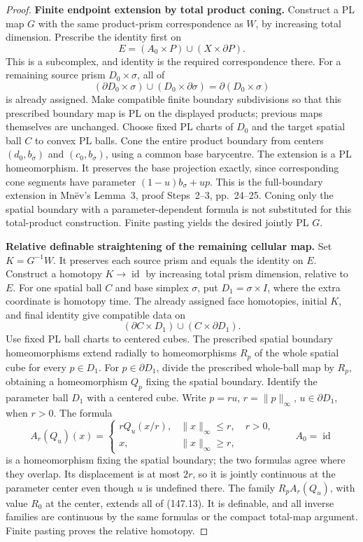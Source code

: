 \begin{proof}
\textbf{Finite endpoint extension by total product coning.}\quad
Construct a PL map \(G\) with the same product-prism correspondence
as \(W\), by increasing total dimension. Prescribe the identity
first on
\[
 E=(A_0\times P)\cup(X\times\partial P).
\]
This is a subcomplex, and identity is the required correspondence
there. For a remaining source prism \(D_0\times\sigma\), all of
\[
 (\partial D_0\times\sigma)\cup(D_0\times\partial\sigma)
       =\partial(D_0\times\sigma)
\]
is already assigned. Make compatible finite boundary subdivisions
so that this prescribed boundary map is PL on the displayed products;
previous maps themselves are unchanged. Choose fixed PL charts of
\(D_0\) and the target spatial ball \(C\) to convex PL balls.
Cone the entire product boundary from centers
\((d_0,b_\sigma)\) and \((c_0,b_\sigma)\), using a common base
barycentre. The extension is a PL homeomorphism. It preserves the
base projection exactly, since corresponding cone segments have
parameter \((1-u)b_\sigma+up\).
This is the full-boundary extension in Mn\"ev's Lemma~3,
proof Steps~2--3, pp.~24--25. Coning only the spatial boundary
with a parameter-dependent formula is not substituted for this
total-product construction.
Finite pasting yields the desired jointly PL \(G\).

\textbf{Relative definable straightening of the remaining cellular map.}\quad
Set \(K=G^{-1}W\). It preserves each source prism and equals the
identity on \(E\). Construct a homotopy \(K\to\operatorname{id}\)
by increasing total prism dimension, relative to \(E\).
For one spatial ball \(C\) and base simplex \(\sigma\), put
\(D_1=\sigma\times I\), where the extra coordinate is homotopy time.
The already assigned face homotopies, initial \(K\), and final identity
give compatible data on
\[
 (\partial C\times D_1)\cup(C\times\partial D_1).
 \tag{147.13}
\]
Use fixed PL ball charts to centered cubes. The prescribed spatial
boundary homeomorphisms extend radially to homeomorphisms \(R_p\)
of the whole spatial cube for every \(p\in D_1\).
For \(p\in\partial D_1\), divide the prescribed whole-ball map by
\(R_p\), obtaining a homeomorphism \(Q_p\) fixing the spatial boundary.
Identify the parameter ball \(D_1\) with a centered cube. Write
\(p=ru\), \(r=\|p\|_\infty\), \(u\in\partial D_1\), when \(r>0\).
The formula
\[
 A_r(Q_u)(x)=
 \begin{cases}
   rQ_u(x/r),&\|x\|_\infty\leq r,\quad r>0,\\
   x,&\|x\|_\infty\geq r,
 \end{cases}
 \qquad A_0=\operatorname{id}
 \tag{147.14}
\]
is a homeomorphism fixing the spatial boundary; the two formulas
agree where they overlap. Its displacement is at most \(2r\),
so it is jointly continuous at the parameter center even though
\(u\) is undefined there. The family \(R_pA_r(Q_u)\), with value
\(R_0\) at the center, extends all of (147.13). It is definable,
and all inverse families are continuous by the same formulas
or the compact total-map argument.
Finite pasting proves the relative homotopy.


\end{proof}
